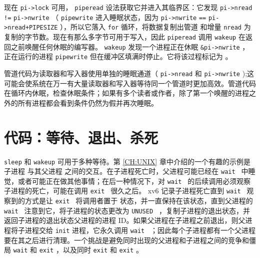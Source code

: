 现在
    \lstinline{pi->lock}    可用，
    \lstinline{piperead}    设法获取它并进入其临界区：它发现
    \lstinline{pi->nread}   
    \lstinline{!=}   
    \lstinline{pi->nwrite}   
       （   \lstinline{pipewrite}    进入睡眠状态，因为
    \lstinline{pi->nwrite}   
    \lstinline{==}   
    \lstinline{pi->nread+PIPESIZE}   
        ），所以它落入
    \lstinline{for}    循环，将数据复制出管道
        和增量
    \lstinline{nread}    为复制的字节数。现在有那么多字节可用于写入，因此
    \lstinline{piperead}    调用
    \lstinline{wakeup}   
        在返回之前唤醒任何休眠的编写器。
    \lstinline{wakeup}    发现一个进程正在休眠
    \lstinline{&pi->nwrite}    ，正在运行的进程
    \lstinline{pipewrite}    但在缓冲区填满时停止。它将该过程标记为
        。  

管道代码为读取器和写入器使用单独的睡眠通道（    \lstinline{pi->nread}    和
    \lstinline{pi->nwrite}    );这可能会使系统在万一有大量读取器和写入器等待同一个管道时更加高效。管道代码在循环内休眠，检查休眠条件；如果有多个读者或作者，除了第一个唤醒的进程之外的所有进程都会看到条件仍然为假并再次睡眠。
    \section{代码：等待、退出、杀死  }   
    \lstinline{sleep}    和
    \lstinline{wakeup}    可用于多种等待。第    \ref{CH:UNIX}    章中介绍的一个有趣的示例是子进程        与其父进程        之间的交互。在子进程死亡时，父进程可能已经在  {    \tt    wait   }  中睡觉，或者可能正在做其他事情；在后一种情况下，对  {    \tt    wait   }  的后续调用必须观察子进程的死亡，可能在调用  {    \tt    exit   }  很久之后。 xv6 记录子进程死亡直到  {    \tt    wait   }  观察到的方式是让  {    \tt    exit   }  将调用者置于        状态，并一直保持在该状态，直到父进程的  {    \tt    wait   }  注意到它，将子进程的状态更改为  {    \tt    UNUSED   }  ，复制子进程的退出状态，并返回子进程的退出状态父进程的进程 ID。如果父进程在子进程之前退出，则父进程将子进程交给
    \lstinline{init}    进程，它永久调用  {    \tt    wait   }  ；因此每个子进程都有一个父进程要在其之后进行清理。一个挑战是避免同时出现的父进程和子进程之间的竞争和僵局
    \lstinline{wait}    和
    \lstinline{exit}    ，以及同时
    \lstinline{exit}    和    \lstinline{exit}    。  

